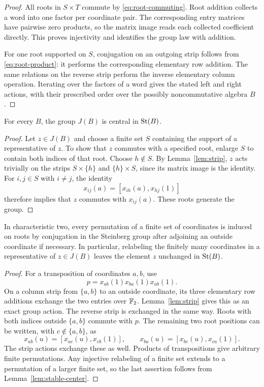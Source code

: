 \begin{proof}
All roots in $S\times T$ commute by \eqref{eq:root-commuting}.
Root addition collects a word into one factor per coordinate pair.
The corresponding entry matrices have pairwise zero products, so the
matrix image reads each collected coefficient directly. This proves
injectivity and identifies the group law with addition.

For one root supported on $S$, conjugation on an outgoing strip follows
from \eqref{eq:root-product}: it performs the corresponding elementary
row addition. The same relations on the reverse strip perform the
inverse elementary column operation. Iterating over the factors of a
word gives the stated left and right actions, with their prescribed
order over the possibly noncommutative algebra $B$.
\end{proof}

\begin{lemma}\label{lem:stable-center}
For every $B$, the group $J(B)$ is central in $\operatorname{St}(B)$.
\end{lemma}

\begin{proof}
Let $z\in J(B)$ and choose a finite set $S$ containing the support of a
representative of $z$. To show that $z$ commutes with a specified root,
enlarge $S$ to contain both indices of that root. Choose $h\notin S$.
By Lemma~\ref{lem:strip}, $z$ acts trivially on the strips $S\times\{h\}$
and $\{h\}\times S$, since its matrix image is the identity. For
$i,j\in S$ with $i\ne j$, the identity
\[
 x_{ij}(a)=[x_{ih}(a),x_{hj}(1)]
\]
therefore implies that $z$ commutes with $x_{ij}(a)$. These roots
generate the group.
\end{proof}

\begin{lemma}\label{lem:permutations}
In characteristic two, every permutation of a finite set of coordinates
is induced on roots by conjugation in the Steinberg group after adjoining
an outside coordinate if necessary. In particular, relabeling the
finitely many coordinates in a representative of $z\in J(B)$ leaves
the element $z$ unchanged in $\operatorname{St}(B)$.
\end{lemma}

\begin{proof}
For a transposition of coordinates $a,b$, use
\[
 p=x_{ab}(1)x_{ba}(1)x_{ab}(1).
\]
On a column strip from $\{a,b\}$ to an outside coordinate, its three
elementary row additions exchange the two entries over $\mathbb F_2$.
Lemma~\ref{lem:strip} gives this as an exact group action. The reverse
strip is exchanged in the same way. Roots with both indices outside
$\{a,b\}$ commute with $p$. The remaining two root positions can be
written, with $c\notin\{a,b\}$, as
\[
 x_{ab}(u)=[x_{ac}(u),x_{cb}(1)],\qquad
 x_{ba}(u)=[x_{bc}(u),x_{ca}(1)].
\]
The strip actions exchange these as well. Products of transpositions
give arbitrary finite permutations. Any injective relabeling of a
finite set extends to a permutation of a larger finite set, so the
last assertion follows from Lemma~\ref{lem:stable-center}.
\end{proof}

